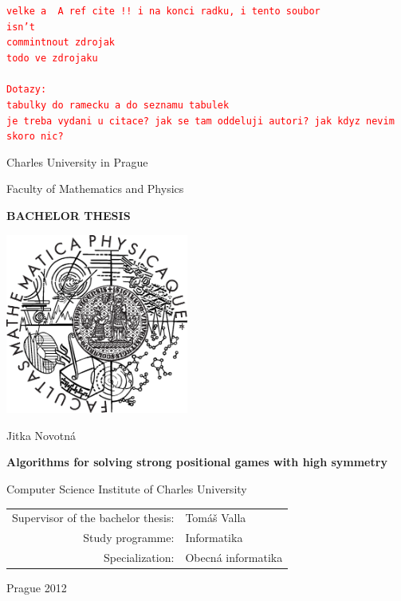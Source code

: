\documentclass[12pt,a4paper,twoside,openright]{report}
\def\TODO#1{
\texttt{\textcolor{red}{#1}}
}
\begin{document}


\TODO{velke
a~ A ref cite !! i na konci radku, i tento soubor\\
isn't\\
commintnout zdrojak\\
todo ve zdrojaku\\
\\Dotazy:\\
tabulky do ramecku a do seznamu tabulek\\
je treba vydani u citace? jak se tam oddeluji autori? jak kdyz nevim skoro nic? 
}
\pagestyle{empty}
\begin{center}

\large

Charles University in Prague

\medskip

Faculty of Mathematics and Physics

\vfill

{\bf\Large BACHELOR THESIS}

\vfill

\centerline{\mbox{\includegraphics[width=60mm]{../img/logo.eps}}}

\vfill
\vspace{5mm}

{\LARGE Jitka Novotná}

\vspace{15mm}

{\LARGE\bfseries Algorithms for solving strong positional games with high symmetry}

\vfill

Computer Science Institute of Charles University
\vfill

\begin{tabular}{rl}

Supervisor of the bachelor thesis: & Tomáš Valla \\
\noalign{\vspace{2mm}}
Study programme: & Informatika \\
\noalign{\vspace{2mm}}
Specialization: & Obecná informatika \\
\end{tabular}

\vfill

Prague 2012

\end{center}
\end{document}
